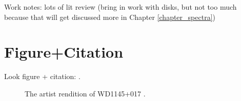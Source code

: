 Work notes: lots of lit review (bring in work with disks, but not too much because that will get discussed more in Chapter \ref{chapter_spectra})


\section{Figure+Citation}

Look figure + citation: \citep[e.g.,][see Fig. \ref{PrettyPic}]{Vanderburg2015}. 

\begin{figure}
\centering
{}
\caption{The artist rendition of WD1145+017 \citep[from][]{Vanderburg2015}.}
\label{PrettyPic}
\end{figure}

